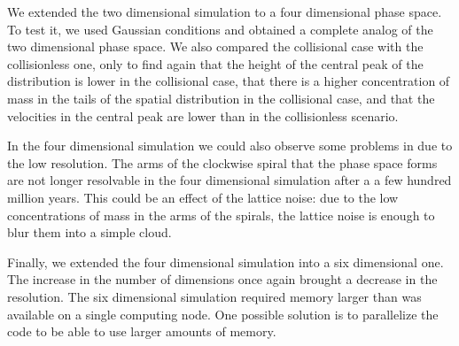 We extended the two dimensional simulation to a four dimensional phase space. To test it, we used Gaussian conditions and obtained a complete analog of the two dimensional phase space. We also compared the collisional case with the collisionless one, only to find again that the height of the central peak of the distribution is lower in the collisional case, that there is a higher concentration of mass in the tails of the spatial distribution in the collisional case, and that the velocities in the central peak are lower than in the collisionless scenario.

In the four dimensional simulation we could also observe some problems in due to the low resolution. The arms of the clockwise spiral that the phase space forms are not longer resolvable in the four dimensional simulation after a a few hundred million years. This could be an effect of the lattice noise: due to the low concentrations of mass in the arms of the spirals, the lattice noise is enough to blur them into a simple cloud. 

Finally, we extended the four dimensional simulation into a six dimensional one. The increase in the number of dimensions once again brought a decrease in the resolution. The six dimensional simulation required memory larger than was available on a single computing node. One possible solution is to parallelize the code to be able to use larger amounts of memory.

